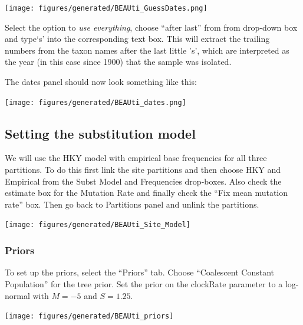 \documentclass[12pt]{article}
\begin{document}
\medskip{}

\begin{center}
\texttt{[image: figures/generated/BEAUti\_GuessDates.png]}
\end{center}

\medskip{}

Select the option to {\it use everything}, choose ``after last'' from from drop-down box and type`s' into the corresponding text box. This will extract the trailing numbers from the taxon names after the last little 's', which are interpreted as the year (in this case since 1900) that the sample was isolated.

The dates panel should now look something like this:

\begin{center}
\texttt{[image: figures/generated/BEAUti\_dates.png]}
\end{center}


\subsection*{Setting the substitution model}
We will use the HKY model with empirical base frequencies for all three partitions. To do this first link the site partitions and then choose HKY and Empirical from the Subst Model and Frequencies drop-boxes. Also check the estimate box for the Mutation Rate and finally check the ``Fix mean mutation rate'' box. Then go back to Partitions panel and unlink the partitions.

\medskip{}

\texttt{[image: figures/generated/BEAUti\_Site\_Model]}

\medskip{}

\subsubsection{Priors }

To set up the priors, select the ``Priors'' tab.
Choose ``Coalescent Constant Population'' for the tree prior. Set the prior on the clockRate parameter to a log-normal with $M=-5$ and $S=1.25$. 

\medskip{}

\begin{center}
\texttt{[image: figures/generated/BEAUti\_priors]}
\end{center}

\medskip{}
\end{document}

